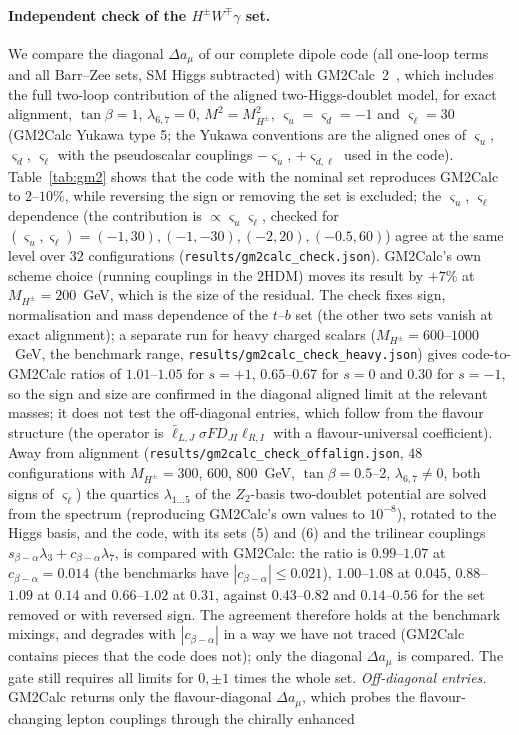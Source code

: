 \documentclass[twocolumn,epjc3]{svjour3}
\begin{document}
\paragraph{Independent check of the $H^\pm W^\mp\gamma$ set.} We compare the diagonal $\Delta a_\mu$ of our complete dipole code (all one-loop terms and all Barr--Zee sets, SM Higgs subtracted) with GM2Calc~2~\cite{Athron:2021evk}, which includes the full two-loop contribution of the aligned two-Higgs-doublet model, for exact alignment, $\tan\beta=1$, $\lambda_{6,7}=0$, $M^2=M_{H^\pm}^2$, $\varsigma_u=\varsigma_d=-1$ and $\varsigma_\ell=30$ (GM2Calc Yukawa type 5; the Yukawa conventions are the aligned ones of $\varsigma_u$, $\varsigma_d$, $\varsigma_\ell$ with the pseudoscalar couplings $-\varsigma_u$, $+\varsigma_{d,\ell}$ used in the code). Table~\ref{tab:gm2} shows that the code with the nominal set reproduces GM2Calc to $2$--$10\%$, while reversing the sign or removing the set is excluded; the $\varsigma_u$, $\varsigma_\ell$ dependence (the contribution is $\propto\varsigma_u\varsigma_\ell$, checked for $(\varsigma_u,\varsigma_\ell)=(-1,30),(-1,-30),(-2,20),(-0.5,60)$) agree at the same level over $32$ configurations (\texttt{results/gm2calc\_check.json}). GM2Calc's own scheme choice (running couplings in the 2HDM) moves its result by $+7\%$ at $M_{H^\pm}=200$~GeV, which is the size of the residual. The check fixes sign, normalisation and mass dependence of the $t$--$b$ set (the other two sets vanish at exact alignment); a separate run for heavy charged scalars ($M_{H^\pm}=600$--$1000$~GeV, the benchmark range, \texttt{results/gm2calc\_check\_heavy.json}) gives code-to-GM2Calc ratios of $1.01$--$1.05$ for $s=+1$, $0.65$--$0.67$ for $s=0$ and $0.30$ for $s=-1$, so the sign and size are confirmed in the diagonal aligned limit at the relevant masses; it does not test the off-diagonal entries, which follow from the flavour structure (the operator is $\bar\ell_{L,J}\sigma F D_{JI}\ell_{R,I}$ with a flavour-universal coefficient). Away from alignment (\texttt{results/gm2calc\_check\_offalign.json}, $48$ configurations with $M_{H^\pm}=300$, $600$, $800$~GeV, $\tan\beta=0.5$--$2$, $\lambda_{6,7}\ne0$, both signs of $\varsigma_\ell$) the quartics $\lambda_{1\ldots5}$ of the $Z_2$-basis two-doublet potential are solved from the spectrum (reproducing GM2Calc's own values to $10^{-8}$), rotated to the Higgs basis, and the code, with its sets (5) and (6) and the trilinear couplings $s_{\beta-\alpha}\lambda_3+c_{\beta-\alpha}\lambda_7$, is compared with GM2Calc: the ratio is $0.99$--$1.07$ at $c_{\beta-\alpha}=0.014$ (the benchmarks have $|c_{\beta-\alpha}|\le0.021$), $1.00$--$1.08$ at $0.045$, $0.88$--$1.09$ at $0.14$ and $0.66$--$1.02$ at $0.31$, against $0.43$--$0.82$ and $0.14$--$0.56$ for the set removed or with reversed sign. The agreement therefore holds at the benchmark mixings, and degrades with $|c_{\beta-\alpha}|$ in a way we have not traced (GM2Calc contains pieces that the code does not); only the diagonal $\Delta a_\mu$ is compared. The gate still requires all limits for $0,\pm1$ times the whole set. \emph{Off-diagonal entries.} GM2Calc returns only the flavour-diagonal $\Delta a_\mu$, which probes the flavour-changing lepton couplings through the chirally enhanced 
\end{document}
